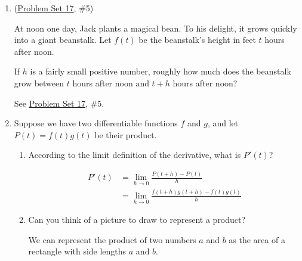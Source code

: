 \documentclass{article}
\begin{document}
\begin{enumerate}
\item  \label{beanstalk-recap} (\href{https://people.math.harvard.edu/~jjchen/mathma/docs/homework/PS17.html}{Problem Set 17}, {{\#5}}) 


  \begin{problem}[0.75in]
    At noon one day, Jack plants a magical bean. To his delight, it grows quickly into a giant beanstalk. Let $f(t)$ be the beanstalk's height in feet $t$ hours after noon.

    If $h$ is a fairly small positive number, roughly how much does the beanstalk grow between $t$ hours after noon and $t + h$ hours after noon? 
  \end{problem}

  \begin{solution}
    See \href{https://people.math.harvard.edu/~jjchen/mathma/docs/homework/PS17.html}{Problem Set 17}, {{\#5}}. 
  \end{solution}

\item  Suppose we have two differentiable functions $f$ and $g$, and let $P(t) = f(t) g(t)$ be their product.
  \begin{enumerate}
  \item \label{product-rule-limit-def}
    \begin{problem}[0.75in]
      According to the limit definition of the derivative, what is $P'(t)$?
    \end{problem}

    \begin{solution}
      \begin{align*}
        P'(t) &= \lim_{h \to 0} \frac{P(t+h)-P(t)}{h} \\
        &=  \lim_{h \to 0} \frac{f(t+h)g(t+h)-f(t)g(t)}{h}
      \end{align*}
    \end{solution}

  \item
    \begin{problem}[\vfill\newpage]
      Can you think of a picture to draw to represent a product?
    \end{problem}

    \begin{solution}
      We can represent the product of two numbers $a$ and $b$ 
      as the area of a rectangle with side
      lengths $a$ and $b$.
    \end{solution}


\end{enumerate}
\end{enumerate}
\end{document}
